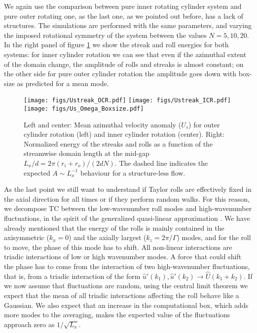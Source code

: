 \documentclass{jfm}
\begin{document}
We again use the comparison between pure inner rotating cylinder system and pure outer rotating one, as the last one, as we pointed out before, has a lack of structures. The simulations are performed with the same parameters, and varying the imposed rotational symmetry of the system between the values $N=5,10,20$. In the right panel of figure \ref{fi:boxsize} we show the streak and roll energies for both systems: for inner cylinder rotation we can see that even if the azimuthal extent of the domain change, the amplitude of rolls and streaks is almost constant; on the other side for pure outer cylinder rotation the amplitude goes down with box-size as predicted for a mean mode.


\begin{figure}
\texttt{[image: figs/Ustreak\_OCR.pdf]}
\texttt{[image: figs/Ustreak\_ICR.pdf]}
\texttt{[image: figs/Us\_Omega\_Boxsize.pdf]}
\centering
\caption{Left and center: Mean azimuthal velocity anomaly ($U_s$) for outer cylinder rotation (left) and inner cylinder rotation (center). Right: Normalized energy of the streaks and rolls as a function of the streamwise domain length at the mid-gap $L_x/d=2\pi (r_i+r_o)/(2dN)$. The dashed line indicates the expected $A\sim L_x^{-1}$ behaviour for a structure-less flow. }
\label{fi:boxsize} 
\end{figure}

As the last point we still want to understand if Taylor rolls are effectively fixed in the axial direction for all times or if  they perform random walks. For this reason, we decompose TC between the low-wavenumber roll modes and high-wavenumber fluctuations, in the spirit of the generalized quasi-linear approximation \citep{tob17}. We have already mentioned that the energy of the rolls is mainly contained in the axisymmetric ($k_x=0$) and the axially largest ($k_z = 2 \pi/\Gamma$) modes, and for the roll to move, the phase of this mode has to shift. All non-linear interactions are triadic interactions of low or high wavenumber modes. A force that could shift the phase has to come from the interaction of two high-wavenumber fluctuations, that is, from a triadic interaction of the form $\widehat{u}'(k_1),\widehat{u}'(k_2) \to \widehat{U}(k_1 + k_2)$. If we now assume that fluctuations are random, using the central limit theorem we expect that the mean of all triadic interactions affecting the roll behave like a Gaussian. We also expect that an increase in the computational box, which adds more modes to the averaging, makes the expected value of the fluctuations approach zero as $1/\sqrt{L_x}$.
\end{document}
